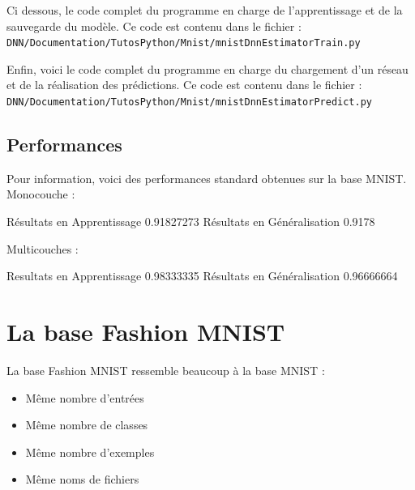 \documentclass[a4paper,11pt]{book}
\begin{document}


Ci dessous, le code complet du programme en charge de l'apprentissage et de la sauvegarde du modèle. Ce code est contenu dans le fichier :\\
\verb+DNN/Documentation/TutosPython/Mnist/mnistDnnEstimatorTrain.py+



Enfin, voici le code complet du programme en charge du chargement d'un réseau et de la réalisation des prédictions. Ce code est contenu dans le fichier :\\
\verb+DNN/Documentation/TutosPython/Mnist/mnistDnnEstimatorPredict.py+



\subsection{Performances}
\label{secPerfMnist}

Pour information, voici des performances standard obtenues sur la base MNIST.
Monocouche :
\begin{myoutput}
Résultats en Apprentissage 0.91827273
Résultats en Généralisation 0.9178
\end{myoutput}

Multicouches :
\begin{myoutput}
Resultats en Apprentissage 0.98333335
Résultats en Généralisation 0.96666664
\end{myoutput}

\section{La base Fashion MNIST}

La base Fashion MNIST ressemble beaucoup à la base MNIST :
\begin{itemize}
\item Même nombre d'entrées
\item Même nombre de classes
\item Même nombre d'exemples
\item Même noms de fichiers
\end{itemize}
\end{document}
